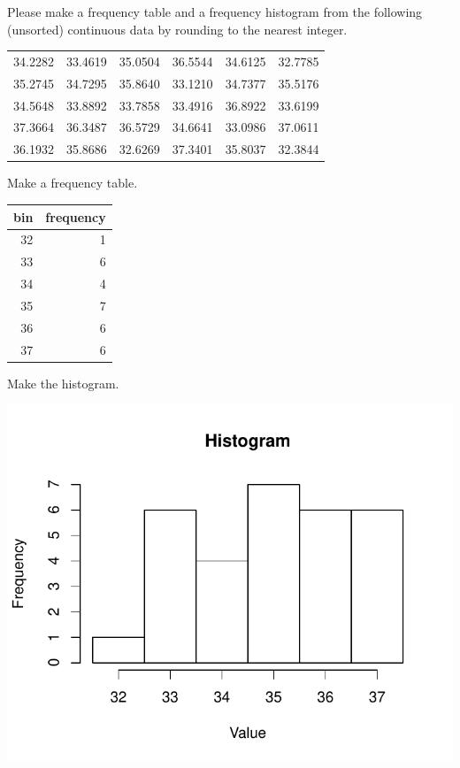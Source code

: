 
\begin{question}
Please make a frequency table and a frequency histogram from the
following (unsorted) continuous data by rounding to the nearest integer.

\begin{longtable}[]{@{}rrrrrr@{}}
\toprule
\endhead
34.2282 & 33.4619 & 35.0504 & 36.5544 & 34.6125 & 32.7785\tabularnewline
35.2745 & 34.7295 & 35.8640 & 33.1210 & 34.7377 & 35.5176\tabularnewline
34.5648 & 33.8892 & 33.7858 & 33.4916 & 36.8922 & 33.6199\tabularnewline
37.3664 & 36.3487 & 36.5729 & 34.6641 & 33.0986 & 37.0611\tabularnewline
36.1932 & 35.8686 & 32.6269 & 37.3401 & 35.8037 & 32.3844\tabularnewline
\bottomrule
\end{longtable}
\end{question}

\begin{solution}
Make a frequency table.

\begin{longtable}[]{@{}rr@{}}
\toprule
bin & frequency\tabularnewline
\midrule
\endhead
32 & 1\tabularnewline
33 & 6\tabularnewline
34 & 4\tabularnewline
35 & 7\tabularnewline
36 & 6\tabularnewline
37 & 6\tabularnewline
\bottomrule
\end{longtable}

Make the histogram.

\includegraphics{barchart-1-4.pdf}\\
\end{solution}

